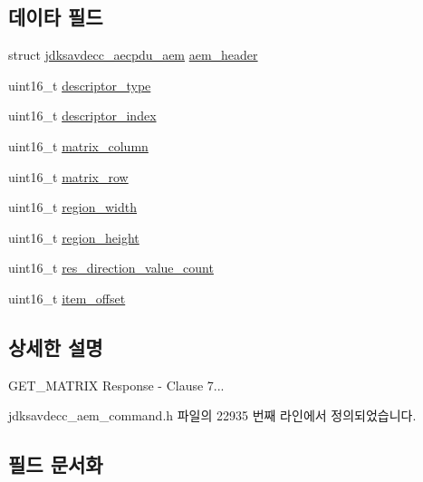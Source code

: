 \subsection*{데이타 필드}
\begin{DoxyCompactItemize}
\item 
struct \hyperlink{structjdksavdecc__aecpdu__aem}{jdksavdecc\+\_\+aecpdu\+\_\+aem} \hyperlink{structjdksavdecc__aem__command__get__matrix__response_ae1e77ccb75ff5021ad923221eab38294}{aem\+\_\+header}
\item 
uint16\+\_\+t \hyperlink{structjdksavdecc__aem__command__get__matrix__response_ab7c32b6c7131c13d4ea3b7ee2f09b78d}{descriptor\+\_\+type}
\item 
uint16\+\_\+t \hyperlink{structjdksavdecc__aem__command__get__matrix__response_a042bbc76d835b82d27c1932431ee38d4}{descriptor\+\_\+index}
\item 
uint16\+\_\+t \hyperlink{structjdksavdecc__aem__command__get__matrix__response_aa7db0d3d8cd5b895d1f9bf81b816fd66}{matrix\+\_\+column}
\item 
uint16\+\_\+t \hyperlink{structjdksavdecc__aem__command__get__matrix__response_a8cb269dcca919ec8232ec33a09477c07}{matrix\+\_\+row}
\item 
uint16\+\_\+t \hyperlink{structjdksavdecc__aem__command__get__matrix__response_a87453b735ebc871f58f507139df28b89}{region\+\_\+width}
\item 
uint16\+\_\+t \hyperlink{structjdksavdecc__aem__command__get__matrix__response_afac2ca21b44ee4f90b555f2609321c60}{region\+\_\+height}
\item 
uint16\+\_\+t \hyperlink{structjdksavdecc__aem__command__get__matrix__response_a0f34ba05787e5027402de5f250c3a5a6}{res\+\_\+direction\+\_\+value\+\_\+count}
\item 
uint16\+\_\+t \hyperlink{structjdksavdecc__aem__command__get__matrix__response_afbb15486d86fc9c3680a6864ddbc029b}{item\+\_\+offset}
\end{DoxyCompactItemize}


\subsection{상세한 설명}
G\+E\+T\+\_\+\+M\+A\+T\+R\+IX Response -\/ Clause 7... 

jdksavdecc\+\_\+aem\+\_\+command.\+h 파일의 22935 번째 라인에서 정의되었습니다.



\subsection{필드 문서화}
